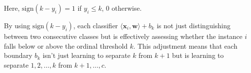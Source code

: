 \documentclass[10pt]{article}
\newcommand{\wv}{\mathbf{w}}
\newcommand{\xv}{\mathbf{x}}
\newcommand{\inner}[2]{\langle #1, #2 \rangle}
\begin{document}
\begin{exercise}
\begin{enumerate}
          Here, $\mathrm{sign}(k-y_i) = 1$ if $y_i \leq k$, 0 otherwise.

          By using $\mathrm{sign}(k-y_i)$, each classifier $\inner{\xv_i}{\wv} + b_k$ is not just distinguishing between two consecutive classes but is effectively assessing whether the instance $i$ falls below or above the ordinal threshold $k$. This adjustment means that each boundary $b_k$ isn't just learning to separate $k$ from $k+1$ but is learning to separate $1, 2, \ldots, k$ from $k+1, \ldots, c$.
            {\vskip0.5cm}
  \end{enumerate}
\end{exercise}
\end{document}
